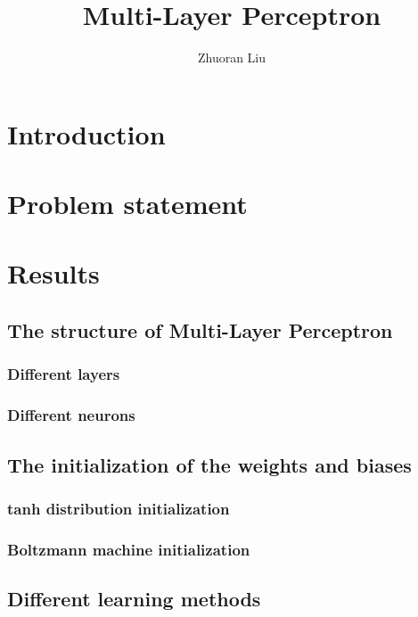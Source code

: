 \documentclass[12pt,a4paper]{article}
\author{Zhuoran Liu}
\title{Multi-Layer Perceptron}
\newif\ifrequirements
\begin{document}
\maketitle

\ifrequirements
\color{red}
\textbf{Document requirements shown by flag \texttt{requirementstrue}.}
\textbf{Set flag \texttt{requirementsfalse}.}

\color{blue}

\color{black}
\fi

\newpage
\section{Introduction}


\section{Problem statement}

\section{Results}
\subsection{The structure of Multi-Layer Perceptron}

\subsubsection{Different layers}
\subsubsection{Different neurons}

\subsection{The initialization of the weights and biases}
\subsubsection{tanh distribution initialization}
\subsubsection{Boltzmann machine initialization}

\subsection{Different learning methods}
\end{document}
